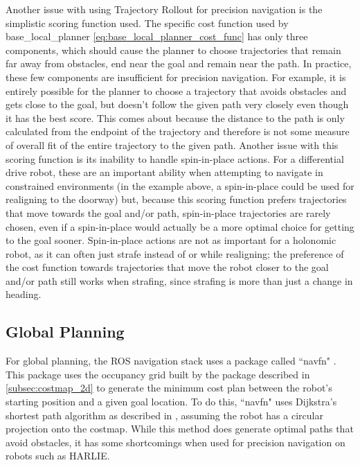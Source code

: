 Another issue with using Trajectory Rollout for precision navigation is the simplistic scoring function used. The specific cost function used by base\_local\_planner \eqref{eq:base_local_planner_cost_func} has only three components, which should cause the planner to choose trajectories that remain far away from obstacles, end near the goal and remain near the path. In practice, these few components are insufficient for precision navigation. For example, it is entirely possible for the planner to choose a trajectory that avoids obstacles and gets close to the goal, but doesn't follow the given path very closely even though it has the best score. This comes about because the distance to the path is only calculated from the endpoint of the trajectory and therefore is not some measure of overall fit of the entire trajectory to the given path. Another issue with this scoring function is its inability to handle spin-in-place actions. For a differential drive robot, these are an important ability when attempting to navigate in constrained environments (in the example above, a spin-in-place could be used for realigning to the doorway) but, because this scoring function prefers trajectories that move towards the goal and/or path, spin-in-place trajectories are rarely chosen, even if a spin-in-place would actually be a more optimal choice for getting to the goal sooner. Spin-in-place actions are not as important for a holonomic robot, as it can often just strafe instead of or while realigning; the preference of the cost function towards trajectories that move the robot closer to the goal and/or path still works when strafing, since strafing is more than just a change in heading.

\subsection{Global Planning}\label{subsec:navfn}

For global planning, the ROS navigation stack uses a package called ``navfn" \autocite{NavFnWiki}. This package uses the occupancy grid built by the package described in \autoref{subsec:costmap_2d} to generate the minimum cost plan between the robot's starting position and a given goal location. To do this, ``navfn" uses Dijkstra's shortest path algorithm as described in \autocite{Lav06}, assuming the robot has a circular projection onto the costmap. While this method does generate optimal paths that avoid obstacles, it has some shortcomings when used for precision navigation on robots such as HARLIE.


